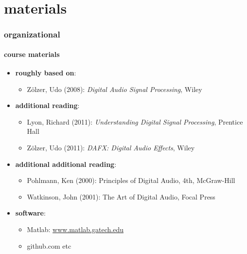     \section{materials}
        \begin{frame}\frametitle{organizational}\framesubtitle{course materials}
        \begin{itemize}
            \item   \textbf{roughly based on}:  
                \begin{itemize}
                    \item   Z\"olzer, Udo (2008): \textit{Digital Audio Signal Processing}, Wiley 
                \end{itemize}
             \pause
             \bigskip
             \item   \textbf{additional  reading}:  
                \begin{itemize}
                    \item   Lyon, Richard (2011): \textit{Understanding Digital Signal Processing}, Prentice Hall 
                    \item   Z\"olzer, Udo (2011): \textit{DAFX: Digital Audio Effects}, Wiley
                \end{itemize}
            \pause
            \bigskip
            \item   \textbf{{additional} additional reading}:
                \begin{itemize}
                    \item   Pohlmann, Ken (2000): Principles of Digital Audio, 4th, McGraw-Hill
                    \item   Watkinson, John (2001): The Art of Digital Audio, Focal Press
                \end{itemize}

            \pause
            \bigskip
            \item   \textbf{software}: 
                \begin{itemize}
                    \item   Matlab: \url{www.matlab.gatech.edu}
                    \item   github.com etc
                \end{itemize}
        \end{itemize}
       \end{frame}

